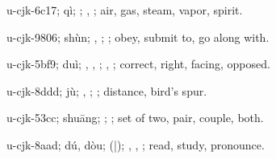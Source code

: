 \begin{multicols}{2}
{\cjkgGlue{}u-cjk-6c17; qì; \cjkgGlue{}; \cjkgGlue{}, \cjkgGlue{}; air, gas, steam, vapor, spirit.

\cjkgGlue{}u-cjk-9806; shùn; \cjkgGlue{}, \cjkgGlue{}; \cjkgGlue{}; obey, submit to, go along with.

\cjkgGlue{}u-cjk-5bf9; duì; \cjkgGlue{}, \cjkgGlue{}, \cjkgGlue{}; \cjkgGlue{}, \cjkgGlue{}; correct, right, facing, opposed.

\cjkgGlue{}u-cjk-8ddd; jù; \cjkgGlue{}\cjkgGlue{}\cjkgGlue{}, \cjkgGlue{}; \cjkgGlue{}; distance, bird's spur.

\cjkgGlue{}u-cjk-53cc; shuāng; \cjkgGlue{}; \cjkgGlue{}; set of two, pair, couple, both.

\cjkgGlue{}u-cjk-8aad; dú, dòu; \cjkgGlue{}\cjkgGlue{}(\cjkgGlue{}|\cjkgGlue{}); \cjkgGlue{}, \cjkgGlue{}, \cjkgGlue{}; read, study, pronounce.

}
\end{multicols}
